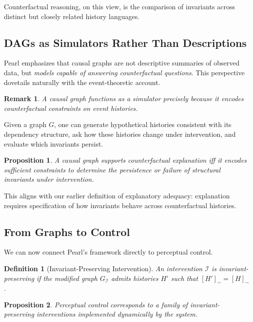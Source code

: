 \documentclass[11pt]{article}
\newtheorem{definition}{Definition}
\newtheorem{remark}{Remark}
\newtheorem{proposition}{Proposition}
\begin{document}
Counterfactual reasoning, on this view, is the comparison of invariants across distinct but closely related history languages.

\subsection{DAGs as Simulators Rather Than Descriptions}

Pearl emphasizes that causal graphs are not descriptive summaries of observed data, but \emph{models capable of answering counterfactual questions}. This perspective dovetails naturally with the event-theoretic account.

\begin{remark}
A causal graph functions as a simulator precisely because it encodes counterfactual constraints on event histories.
\end{remark}

Given a graph $G$, one can generate hypothetical histories consistent with its dependency structure, ask how these histories change under intervention, and evaluate which invariants persist.

\begin{proposition}
A causal graph supports counterfactual explanation iff it encodes sufficient constraints to determine the persistence or failure of structural invariants under intervention.
\end{proposition}

This aligns with our earlier definition of explanatory adequacy: explanation requires specification of how invariants behave across counterfactual histories.

\subsection{From Graphs to Control}

We can now connect Pearl’s framework directly to perceptual control.

\begin{definition}[Invariant-Preserving Intervention]
An intervention $\mathcal{I}$ is invariant-preserving if the modified graph $G_{\mathcal{I}}$ admits histories $H'$ such that $[H']_{\sim} = [H]_{\sim}$.
\end{definition}

\begin{proposition}
Perceptual control corresponds to a family of invariant-preserving interventions implemented dynamically by the system.
\end{proposition}
\end{document}
